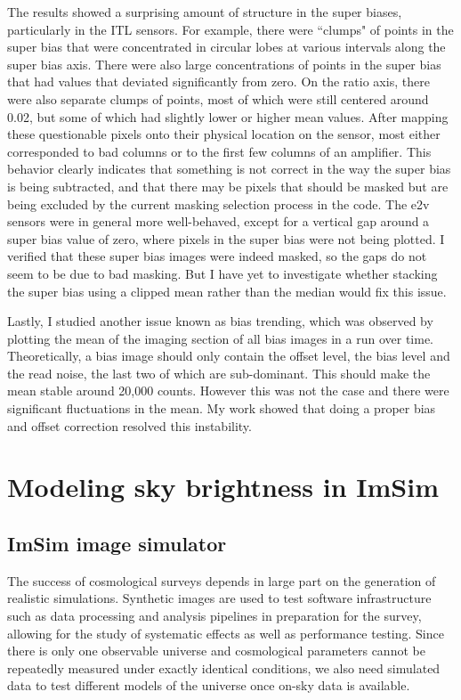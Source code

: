 The results showed a surprising amount of structure in the super biases, particularly in the ITL sensors. For example, there were ``clumps" of points in the super bias that were concentrated in circular lobes at various intervals along the super bias axis. There were also large concentrations of points in the super bias that had values that deviated significantly from zero. On the ratio axis, there were also separate clumps of points, most of which were still centered around 0.02, but some of which had slightly lower or higher mean values. After mapping these questionable pixels onto their physical location on the sensor, most either corresponded to bad columns or to the first few columns of an amplifier. This behavior clearly indicates that something is not correct in the way the super bias is being subtracted, and that there may be pixels that should be masked but are being excluded by the current masking selection process in the  code. The e2v sensors were in general more well-behaved, except for a vertical gap around a super bias value of zero, where pixels in the super bias were not being plotted. I verified that these super bias images were indeed masked, so the gaps do not seem to be due to bad masking. But I have yet to investigate whether stacking the super bias using a clipped mean rather than the median would fix this issue. 

Lastly, I studied another issue known as bias trending, which was observed by plotting the mean of the imaging section of all bias images in a run over time. Theoretically, a bias image should only contain the offset level, the bias level and the read noise, the last two of which are sub-dominant. This should make the mean stable around 20,000 counts. However this was not the case and there were significant fluctuations in the mean. My work showed that doing a proper bias and offset correction resolved this instability.


\section{Modeling sky brightness in ImSim}

\subsection{ImSim image simulator}

The success of cosmological surveys depends in large part on the generation of realistic simulations. Synthetic images are used to test software infrastructure such as data processing and analysis pipelines in preparation for the survey, allowing for the study of systematic effects as well as performance testing. Since there is only one observable universe and cosmological parameters cannot be repeatedly measured under exactly identical conditions, we also need simulated data to test different models of the universe once on-sky data is available.


